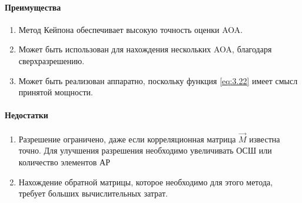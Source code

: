 \paragraph{Преимущества}%
\begin{enumerate}
    \item Метод Кейпона обеспечивает высокую точность оценки AOA.
    \item Может быть использован для нахождения нескольких AOA, благодаря сверхразрешению. 
    \item Может быть реализован аппаратно, поскольку функция \eqref{eq:3.22} имеет смысл принятой мощности.
\end{enumerate}
\paragraph{Недостатки}%
\begin{enumerate}
    \item Разрешение ограничено, даже если корреляционная матрица $\vec M$
    известна точно. Для улучшения разрешения необходимо увеличивать ОСШ или
    количество элементов АР
    \item Нахождение обратной матрицы, которое необходимо для этого метода, требует больших вычислительных затрат.
\end{enumerate}